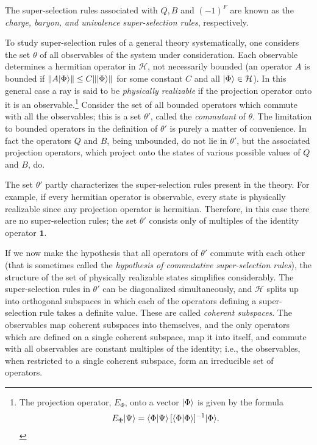 The super-selection rules associated with \(Q,B\) and \((-1)^F\) are known as
the \emph{charge, baryon, and univalence super-selection rules}, respectively.

To study super-selection rules of a general theory systematically, one
considers the set \(\theta\) of all observables of the system under
consideration. Each observable determines a hermitian operator in
\(\mathcal H\), not necessarily bounded (an operator \(A\) is bounded if
\(\lVert A\lvert \Phi\rangle\rVert\leq C\lVert\lvert \Phi\rangle\rVert\) for some constant
\(C\) and all \(\lvert \Phi\rangle\in\mathcal H\)). In this general case a ray is
said to be \emph{physically realizable} if the projection operator onto it is
an observable.\footnote{%
The projection operator, \(E_{\Phi}\), onto a vector \(\lvert \Phi\rangle\) is given by
the formula
\begin{equation*}
  E_{\Phi}\lvert \Psi\rangle
  =\langle \Phi\vert \Psi\rangle\,[\langle \Phi\vert \Phi\rangle]^{-1}\lvert \Phi\rangle.
\end{equation*}}
Consider the set of all bounded operators which commute with all the
observables; this is a set \(\theta'\), called the \emph{commutant} of
\(\theta\). The limitation to bounded operators in the definition of
\(\theta'\) is purely a matter of convenience. In fact the operators \(Q\) and
\(B\), being unbounded, do not lie in \(\theta'\), but the associated
projection operators, which project onto the states of various possible
values of \(Q\) and \(B\), do.

The set \(\theta'\) partly characterizes the super-selection rules present in
the theory. For example, if every hermitian operator is observable, every
state is physically realizable since any projection operator is hermitian.
Therefore, in this case there are no super-selection rules; the set \(\theta'\)
consists only of multiples of the identity operator \(\mathbf{1}\).

If we now make the hypothesis that all operators of \(\theta'\) commute with
each other (that is sometimes called the \emph{hypothesis of commutative
super-selection rules}), the structure of the set of physically realizable
states simplifies considerably. The super-selection rules in \(\theta'\) can
be diagonalized simultaneously, and \(\mathcal H\) splits up into orthogonal
subspaces in which each of the operators defining a super-selection rule
takes a definite value. These are called \emph{coherent subspaces}. The
observables map coherent subspaces into themselves, and the only operators
which are defined on a single coherent subspace, map it into itself, and
commute with all observables are constant multiples of the identity; i.e., the
observables, when restricted to a single coherent subspace, form an
irreducible set of operators.

